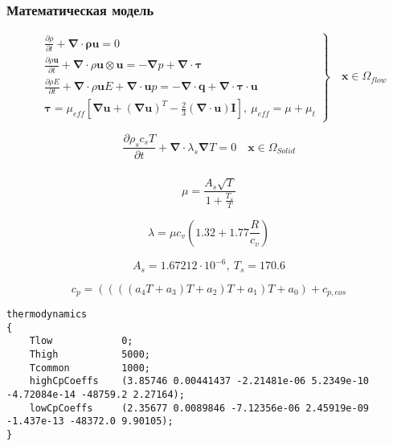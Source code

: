 \documentclass[10pt,xcolor={dvipsnames,table},aspectratio=169]{beamer}
\begin{document}
    \begin{frame}{}

        \justifying
        \normalsize

        \frametitle{Математическая модель}

        \[
            \left.
            \begin{aligned}
                &\frac{\partial \rho}{\partial t}
                + \symbf{\nabla} \cdot \symbf{\rho u} = 0 \\
                &\frac{\partial \rho \symbf{u}}{\partial t}
                + \symbf{\nabla} \cdot \rho \symbf{u} \otimes \symbf{u}
                =
                - \symbf{\nabla} p
                + \symbf{\nabla} \cdot \symbf{\tau}\\
                &\frac{\partial \rho E}{\partial t}
                + \symbf{\nabla} \cdot \rho \symbf{u} E
                + \symbf{\nabla} \cdot \symbf{u} p
                =
                - \symbf{\nabla} \cdot \symbf{q}
                + \symbf{\nabla} \cdot \symbf{\tau \cdot \symbf{u}}\\
                &\symbf{\tau} = \mu_{eff} \left[ \symbf{\nabla} \symbf{u} + \left( \symbf{\nabla} \symbf{u} \right) ^{T}  - \frac{2}{3} \left(  \symbf{\nabla} \cdot \symbf{u} \right) \symbf{I} \right], \: \mu_{eff} = \mu + \mu_{t}
            \end{aligned} \right\rbrace \quad \symbf{x} \in \Omega_{flow}
        \]

        \[
            \frac{\partial \rho_{s} c_{s} T}{\partial t} + \symbf{\nabla} \cdot \lambda_{s} \symbf{\nabla} T = 0 \quad \symbf{x} \in \Omega_{Solid}
        \]

    \end{frame}{}

    \begin{frame}[fragile]

        \justifying
        \normalsize

        \frametitle{}

        \[
             \mu = \frac{A_{s} \sqrt{T}}{1 + \frac{T_{s}}{T}}
        \]

        \[
            \lambda = \mu c_{v} \left( 1.32 + 1.77 \frac{R}{c_{v}} \right)
        \]

        \[
            A_{s} = 1.67212 \cdot 10^{-6}, \: T_{s} = 170.6
        \]

        \[
            c_{p} = ((((a_{4} T + a_{3}) T + a_{2}) T + a_{1}) T + a_{0}) + c_{p, eos}
        \]
        {\centering\scriptsize
        \begin{lstlisting}
thermodynamics
{
    Tlow            0;
    Thigh           5000;
    Tcommon         1000;
    highCpCoeffs    (3.85746 0.00441437 -2.21481e-06 5.2349e-10 -4.72084e-14 -48759.2 2.27164);
    lowCpCoeffs     (2.35677 0.0089846 -7.12356e-06 2.45919e-09 -1.437e-13 -48372.0 9.90105);
}
        \end{lstlisting}
        }

    \end{frame}
\end{document}
